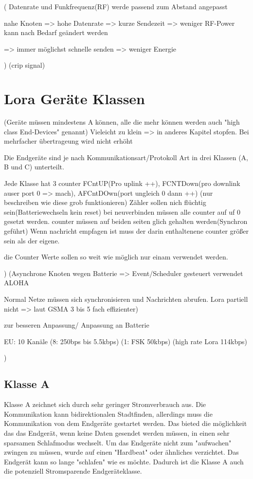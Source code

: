 \documentclass[a4paper,12pt]{article}
\begin{document}
                \cite{LoraLimit}(
                    Datenrate und Funkfrequenz(RF) werde passend zum Abstand angepasst

                    nahe Knoten => hohe Datenrate => kurze Sendezeit => weniger RF-Power
                    kann nach Bedarf geändert werden

                    => immer möglichst schnelle senden => weniger Energie

                )
                \cite{LoraClasses}(crip signal)
    \section{Lora Geräte Klassen} \label{sec:klassen}
        \cite{LoRaSpec}(Geräte müssen mindestens A können, alle die mehr können werden auch "high class End-Devices" genannt)
        Vieleicht zu klein => in anderes Kapitel stopfen. Bei mehrfacher übertrageung wird nicht erhöht

        Die Endgeräte sind je nach Kommunikationsart/Protokoll Art in drei Klassen (A, B und C) unterteilt. 
        
        Jede Klasse hat 3 counter FCntUP(Pro uplink ++), FCNTDown(pro downlink auser port 0 => mach), AFCntDOwn(port ungleich 0 dann ++)   (nur beschreiben wie diese grob funktionieren) Zähler sollen nich flüchtig sein(Batteriewechseln kein reset)
        bei neuverbinden müssen alle counter auf uf 0 gesetzt werden. counter müssen auf beiden seiten glich gehalten werden(Synchron geführt)
        Wenn nachricht empfagen ist muss der darin enthaltenene counter größer sein als der eigene. 

        die Counter Werte sollen so weit wie möglich nur einam verwendet werden.
        
        )
        \cite{LoraClasses}
        \cite{WhatIsLoRa}(Asynchrone Knoten wegen Batterie => Event/Scheduler gesteuert verwendet ALOHA
        
        Normal Netze müssen sich synchronisieren und Nachrichten abrufen. Lora partiell nicht => laut GSMA 3 bis 5 fach effizienter)
    
        zur besseren Anpassung/ Anpassung an Batterie
        
        EU: 10 Kanäle (8: 250bps bis 5.5kbps) (1: FSK 50kbps) (high rate Lora 114kbps)

        )
        \subsection{Klasse A}\label{sec:ClassA}
            Klasse A zeichnet sich durch sehr geringer Stromverbrauch aus. Die Kommunikation kann bidirektionalen Stadtfinden, allerdings muss die Kommunikation von dem Endgeräte gestartet werden. Das bieted die möglichkeit das das Endgerät, wenn keine Daten gesendet werden müssen, in einen sehr
            sparsamen Schlafmodus wechselt. Um das Endgeräte nicht zum "aufwachen" zwingen zu müssen, wurde auf einen "Hardbeat" oder ähnliches verzichtet. Das Endgerät kann so lange "schlafen" wie es möchte. Dadurch ist die Klasse A auch die potenziell Stromsparende Endgeräteklasse.
            
\end{document}
